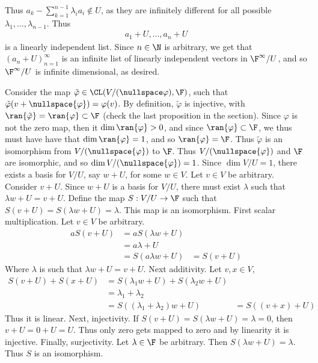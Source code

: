 \documentclass{book}
\begin{document}
\begin{enumerate}[label=\arabic*)]
\begin{enumerate}[label=\alph*)]
          Thus $a_k - \sum_{k = 1}^{n - 1}\lambda_ia_i \not\in U$, as they are infinitely different for all possible $\lambda_1, \dots, \lambda_{n - 1}$. Thus 
          \begin{align*}
            a_1 + U, \dots, a_n + U 
          \end{align*}
          is a linearly independent list. Since $n \in \N$ is arbitrary, we get that $(a_n + U)_{n = 1}^{\infty}$ is an infinite list of linearly independent vectors in $\F^\infty/U$, and so
          $\F^\infty/U$ is infinite dimensional, as desired.
      \end{enumerate}
    \ii
      Consider the map $\tilde{\varphi} \in \CL(V/(\nullspace\varphi), \F)$, such that $\tilde{\varphi}(v + \nullspace{\varphi}) = \varphi(v)$. By definition, $\tilde{\varphi}$ is injective,
      with $\ran{\tilde{\varphi}} = \ran{\varphi} \subset \F$ (check the last proposition in the section). Since $\varphi$ is not the zero map, then it $\dim{\ran{\varphi}} > 0$, and since
      $\ran{\varphi} \subset \F$, we thus must have have that $\dim\ran{\varphi} = 1$, and so $\ran{\varphi} = \F$. Thus $\tilde{\varphi}$ is an isomorphism from $V/(\nullspace{\varphi})$ to
      $\F$. Thus $V/(\nullspace{\varphi})$ and $\F$ are isomorphic, and so $\dim V/(\nullspace{\varphi}) = 1$.
    \ii
      Since $\dim V/U = 1$, there exists a basis for $V/U$, say $w + U$, for some $w \in V$. Let $v \in V$ be arbitrary. Consider $v + U$. Since $w + U$ is a basis for $V/U$, there must
      exist $\lambda$ such that $\lambda w + U = v + U$. Define the map $S: V/U \to \F$ such that $S(v + U) = S(\lambda w + U) = \lambda$. This map is an isomorphism. First scalar
      multiplication. Let $v \in V$ be arbitrary.
      \begin{align*}
        aS(v + U) & = aS(\lambda w + U) \\
        & = a\lambda + U \\
        & = S(a\lambda w + U) 
        & = S(v + U)
      \end{align*}
      Where $\lambda$ is such that $\lambda w + U = v + U$. Next additivity. Let $v, x \in V$,
      \begin{align*}
        S(v + U) + S(x + U) & = S(\lambda_1 w + U) + S(\lambda_2 w + U) \\
        & = \lambda_1 + \lambda_2 \\
        & = S( (\lambda_1 + \lambda_2)w + U)
        & = S( (v + x) + U)
      \end{align*}
      Thus it is linear. Next, injectivity. If $S(v + U) = S(\lambda w + U) = \lambda = 0$, then $v + U = 0 + U = U$. Thus only zero gets mapped to zero and by linearity it is injective.
      Finally, surjectivity. Let $\lambda \in \F$ be arbitrary. Then $S(\lambda w + U) = \lambda$. Thus $S$ is an isomorphism. 


\end{enumerate}
\end{document}
